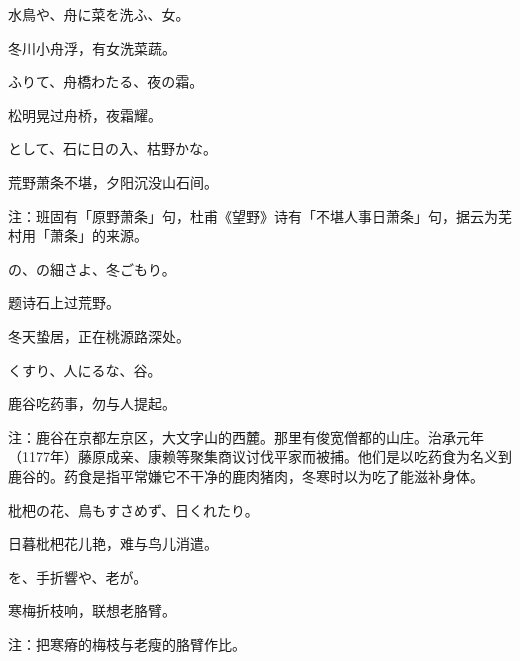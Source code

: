 \begin{haiku}
    {\FH 水鳥や、舟に菜を洗ふ、女。}

    {\FK 冬川小舟浮，有女洗菜蔬。}
\end{haiku}

\begin{haiku}
    {\FH {}ふりて、舟橋わたる、夜の霜。}

    {\FK 松明晃过舟桥，夜霜耀。}
\end{haiku}

\begin{haiku}
    {\FH {}として、石に日の入、枯野かな。}

    {\FK 荒野萧条不堪，夕阳沉没山石间。}

    {\FT 注：班固有「原野萧条」句，杜甫《望野》诗有「不堪人事日萧条」句，据云为芜村用「萧条」的来源。}
\end{haiku}

\begin{haiku}
    {\FH {}の、の細さよ、冬ごもり。}

    {\FK 题诗石上过荒野。}

    {\FK 冬天蛰居，正在桃源路深处。}
\end{haiku}

\begin{haiku}
    {\FH くすり、人にるな、谷。}

    {\FK 鹿谷吃药事，勿与人提起。}

    {\FT 注：鹿谷在京都左京区，大文字山的西麓。那里有俊宽僧都的山庄。治承元年（1177年）藤原成亲、康赖等聚集商议讨伐平家而被捕。他们是以吃药食为名义到鹿谷的。药食是指平常嫌它不干净的鹿肉猪肉，冬寒时以为吃了能滋补身体。}
\end{haiku}

\begin{haiku}
    {\FH 枇杷の花、鳥もすさめず、日くれたり。}

    {\FK 日暮枇杷花儿艳，难与鸟儿消遣。}
\end{haiku}

\begin{haiku}
    {\FH {}を、手折響や、老が。}

    {\FK 寒梅折枝响，联想老胳臂。}

    {\FT 注：把寒瘠的梅枝与老瘦的胳臂作比。}
\end{haiku}

